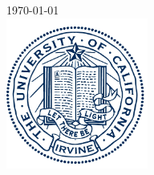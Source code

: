 \documentclass[12pt]{article}
\begin{document}
\begin{titlepage}

{\large \today}\\[2cm] %


\includegraphics[width=0.35\textwidth]{pics/logo.jpg}


\vfill %

\end{titlepage}








\small

\normalsize
%
\end{document}
